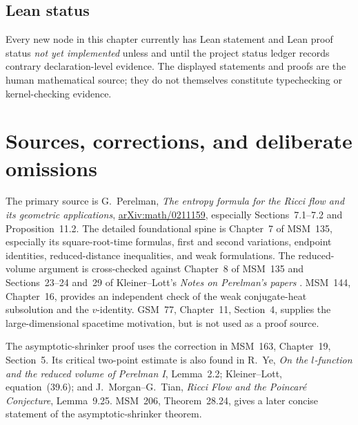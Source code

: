 \documentclass[10pt]{coll-l}
\theoremstyle{definition}
\theoremstyle{remark}
\numberwithin{section}{chapter}
\numberwithin{equation}{chapter}
\begin{document}
\subsection*{Lean status}

Every new node in this chapter currently has Lean statement and Lean proof
status \emph{not yet implemented} unless and until the project status ledger
records contrary declaration-level evidence.  The displayed statements and
proofs are the human mathematical source; they do not themselves constitute
typechecking or kernel-checking evidence.

\section{Sources, corrections, and deliberate omissions}
\label{sec:red-sources}

The primary source is G.~Perelman,
\emph{The entropy formula for the Ricci flow and its geometric applications},
\href{https://arxiv.org/abs/math/0211159}{arXiv:math/0211159}, especially
Sections~7.1--7.2 and Proposition~11.2.  The detailed foundational spine is
Chapter~7 of MSM~135, especially its square-root-time formulas, first and
second variations, endpoint identities, reduced-distance inequalities, and
weak formulations.  The reduced-volume argument is cross-checked against
Chapter~8 of MSM~135 and Sections~23--24 and~29 of Kleiner--Lott's
\emph{Notes on Perelman's papers} \cite{MR2460872}.  MSM~144, Chapter~16,
provides an independent check of the weak conjugate-heat subsolution and the
$v$-identity.  GSM~77, Chapter~11, Section~4, supplies the large-dimensional
spacetime motivation, but is not used as a proof source.

The asymptotic-shrinker proof uses the correction in MSM~163, Chapter~19,
Section~5.  Its critical two-point estimate is also found in R.~Ye,
\emph{On the $l$-function and the reduced volume of Perelman I}, Lemma~2.2;
Kleiner--Lott, equation~(39.6); and J.~Morgan--G.~Tian,
\emph{Ricci Flow and the Poincar\'e Conjecture}, Lemma~9.25.  MSM~206,
Theorem~28.24, gives a later concise statement of the asymptotic-shrinker
theorem.
\end{document}
